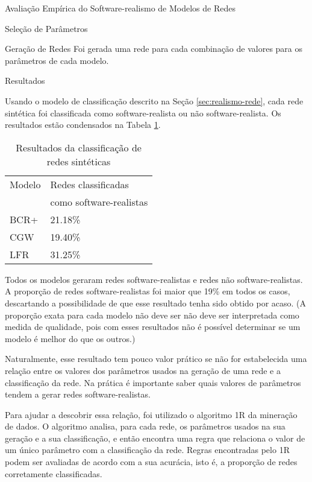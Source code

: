 \begin{section}{Avaliação Empírica do Software-realismo de Modelos de Redes}
\begin{subsection}{Seleção de Parâmetros}
\end{subsection}

\begin{section}{Geração de Redes}
	Foi gerada uma rede para cada combinação de valores para os parâmetros de cada modelo. %
\end{section}

\begin{subsection}{Resultados}

Usando o modelo de classificação descrito na Seção \ref{sec:realismo-rede}, cada rede sintética foi classificada como software-realista ou não software-realista. Os resultados estão condensados na Tabela \ref{tab:results}.

\begin{table}
\caption{Resultados da classificação de redes sintéticas}
\centering
\begin{tabular}{|l|l|}
\hline
Modelo & Redes classificadas \\ & como software-realistas \\
\hline 
\hline
BCR+ & 21.18\% \\ %
\hline
CGW  & 19.40\% \\  %
\hline
LFR  & 31.25\% \\ %
\hline
\end{tabular}
\label{tab:results}
\end{table}

Todos os modelos geraram redes software-realistas e redes não software-realistas. A proporção de redes software-realistas foi maior que 19\% em todos os casos, descartando a possibilidade de que esse resultado tenha sido obtido por acaso. (A proporção exata para cada modelo não deve ser não deve ser interpretada como medida de qualidade, pois com esses resultados não é possível determinar se um modelo é melhor do que os outros.)

Naturalmente, esse resultado tem pouco valor prático se não for estabelecida uma relação entre os valores dos parâmetros usados na geração de uma rede e a classificação da rede. Na prática é importante saber quais valores de parâmetros tendem a gerar redes software-realistas.

Para ajudar a descobrir essa relação, foi utilizado o algoritmo 1R \cite{OneR} da mineração de dados. O algoritmo analisa, para cada rede, os parâmetros usados na sua geração e a sua classificação, e então encontra uma regra que relaciona o valor de um único parâmetro com a classificação da rede. Regras encontradas pelo 1R podem ser avaliadas de acordo com a sua acurácia, isto é, a proporção de redes corretamente classificadas.


\end{subsection}
\end{section}

